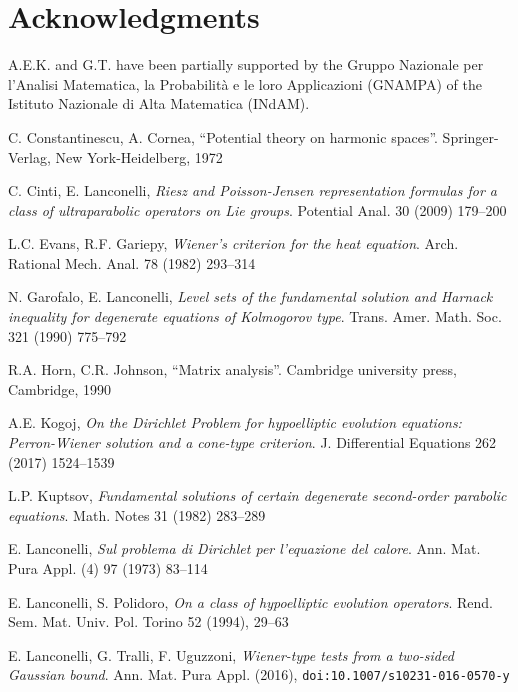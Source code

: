 \documentclass[10pt]{amsart}
\numberwithin{equation}{section}
\begin{document}
\section*{Acknowledgments}

A.E.K. and G.T.  have been partially supported by the Gruppo Nazionale per l'Analisi Matematica, la Probabilit\`a e le
loro Applicazioni (GNAMPA) of the Istituto Nazionale di Alta Matematica (INdAM).





\begin{thebibliography}{10}

C. Constantinescu, A. Cornea, 
``Potential theory on harmonic spaces''. Springer-Verlag, New York-Heidelberg, 1972
 		
C. Cinti, E. Lanconelli,
\textit{Riesz and Poisson-Jensen representation formulas for a class of ultraparabolic operators on Lie groups}. 
Potential Anal. 30 (2009) 179--200

L.C. Evans, R.F. Gariepy,
\textit{Wiener's criterion for the heat equation}.
 Arch. Rational Mech. Anal. 78 (1982) 293--314

N. Garofalo, E. Lanconelli,
\textit{Level sets of the fundamental solution and Harnack inequality for degenerate equations of Kolmogorov type}.
Trans. Amer. Math. Soc. 321 (1990) 775--792

R.A. Horn, C.R. Johnson,
``Matrix analysis''. Cambridge university press, Cambridge, 1990 

A.E. Kogoj,
\textit{On the Dirichlet Problem for hypoelliptic evolution equations: Perron-Wiener solution and a cone-type criterion}.
J. Differential Equations 262 (2017) 1524--1539

L.P. Kuptsov,
\textit{Fundamental solutions of certain degenerate second-order parabolic equations}.
Math. Notes 31 (1982) 283--289

E. Lanconelli,
\textit{Sul problema di Dirichlet per l'equazione del calore}.
Ann. Mat. Pura Appl. (4) 97 (1973) 83--114

E. Lanconelli, S. Polidoro,  
\textit{On a class of hypoelliptic evolution operators}. 
Rend. Sem. Mat. Univ. Pol. Torino 52 (1994), 29--63

E. Lanconelli, G. Tralli, F. Uguzzoni,
\textit{Wiener-type tests from a two-sided Gaussian bound}.
Ann. Mat. Pura Appl. (2016), \verb|doi:10.1007/s10231-016-0570-y| 


\end{thebibliography}
\end{document}
